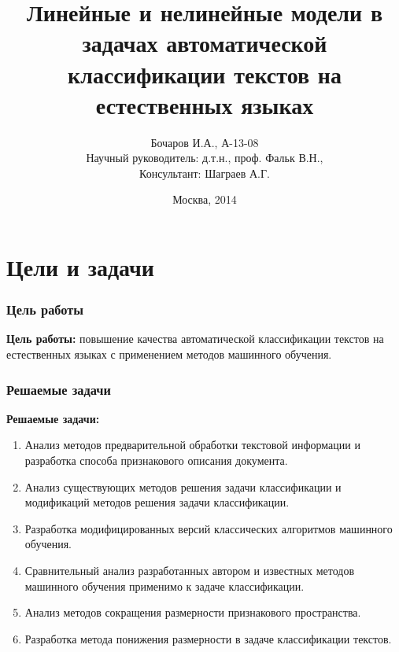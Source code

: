 \documentclass{beamer}
\begin{document}
\title[Линейные и нелинейные модели]{Линейные и нелинейные модели в задачах автоматической классификации текстов на естественных языках}  
\author[Бочаров И.А.]{Бочаров И.А., А-13-08 \\Научный руководитель: д.т.н., проф. Фальк В.Н.,\\Консультант: Шаграев А.Г.}

\date{Москва, 2014} 
\begin{frame}[plain]
	\titlepage
\end{frame}
\begin{frame}
	\tableofcontents
\end{frame}

\section{Цели и задачи}
\begin{frame}
	\tableofcontents[currentsection]
\end{frame}

\begin{frame}
\frametitle{Цель работы}
\textbf{Цель работы:} повышение качества автоматической классификации текстов на естественных языках с применением методов машинного обучения.\\
\end{frame}

\begin{frame}
\frametitle{Решаемые задачи}

\textbf{Решаемые задачи:}
\begin{enumerate}
	\item{Анализ методов предварительной обработки текстовой информации и разработка способа признакового описания документа.}
	\item{Анализ существующих методов решения задачи классификации и модификаций методов решения задачи классификации.}
	\item{Разработка модифицированных версий классических алгоритмов машинного обучения.}
	\item{Сравнительный анализ разработанных автором и известных методов машинного обучения применимо к задаче классификации.}
	\item{Анализ методов сокращения размерности признакового пространства.}
	\item{Разработка метода понижения размерности в задаче классификации текстов.}
\end{enumerate}
\end{frame}
\end{document}
